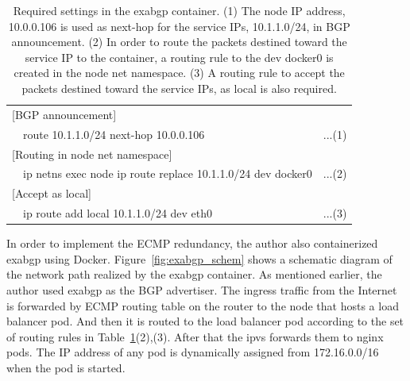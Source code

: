 \begin{table}
  \centering
  \begin{tabular}{lllr}
    \hline 
      \multicolumn{4}{l}{[BGP announcement]} \\
      \hspace{15 mm} & \multicolumn{2}{l}{route 10.1.1.0/24 next-hop 10.0.0.106} & ...(1) \\
      \multicolumn{4}{l}{[Routing in node net namespace]} \\
      \hspace{15 mm} & \multicolumn{2}{l}{ip netns exec node ip route replace 10.1.1.0/24 dev docker0} & ...(2) \\
      \multicolumn{4}{l}{[Accept as local]} \\
      \hspace{15 mm} & \multicolumn{2}{l}{ip route add local 10.1.1.0/24 dev eth0} & ...(3) \\
      \hline
  \end{tabular}
  
  \par\bigskip
  \centering
  \begin{minipage}{0.9\columnwidth}
    \caption[Required settings in the exabgp container]{
      Required settings in the exabgp container.
      (1) The node IP address, 10.0.0.106 is used as next-hop for the service IPs, 10.1.1.0/24, in BGP announcement.
      (2) In order to route the packets destined toward the service IP to the container, a routing rule to the dev docker0 is created in the node net namespace. 
      (3) A routing rule to accept the packets destined toward the service IPs,  as local is also required.
    }
    \label{table:exabgp_setting}
  \end{minipage}

\end{table}

In order to implement the ECMP redundancy, the author also containerized exabgp using Docker.
Figure~\ref{fig:exabgp_schem} shows a schematic diagram of the network path realized by the exabgp container.
As mentioned earlier, the author used exabgp as the BGP advertiser. 
The ingress traffic from the Internet is forwarded by ECMP routing table on the router to the node that hosts a load balancer pod.
And then it is routed to the load balancer pod according to the set of routing rules in Table~\ref{table:exabgp_setting}(2),(3).
After that the ipvs forwards them to nginx pods.
The IP address of any pod is dynamically assigned from 172.16.0.0/16 when the pod is started. 


